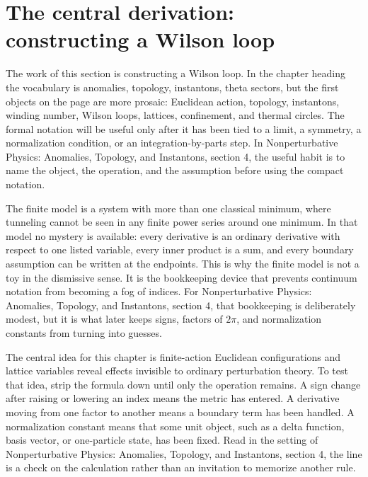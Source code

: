 \section{The central derivation: constructing a Wilson loop}













The work of this section is constructing a Wilson loop.  In the chapter heading the vocabulary is anomalies, topology, instantons, theta sectors, but the first objects on the page are more prosaic: Euclidean action, topology, instantons, winding number, Wilson loops, lattices, confinement, and thermal circles.  The formal notation will be useful only after it has been tied to a limit, a symmetry, a normalization condition, or an integration-by-parts step.  In Nonperturbative Physics: Anomalies, Topology, and Instantons, section 4, the useful habit is to name the object, the operation, and the assumption before using the compact notation.

The finite model is a system with more than one classical minimum, where tunneling cannot be seen in any finite power series around one minimum.  In that model no mystery is available: every derivative is an ordinary derivative with respect to one listed variable, every inner product is a sum, and every boundary assumption can be written at the endpoints.  This is why the finite model is not a toy in the dismissive sense.  It is the bookkeeping device that prevents continuum notation from becoming a fog of indices.  For Nonperturbative Physics: Anomalies, Topology, and Instantons, section 4, that bookkeeping is deliberately modest, but it is what later keeps signs, factors of \(2\pi\), and normalization constants from turning into guesses.

The central idea for this chapter is finite-action Euclidean configurations and lattice variables reveal effects invisible to ordinary perturbation theory.  To test that idea, strip the formula down until only the operation remains.  A sign change after raising or lowering an index means the metric has entered.  A derivative moving from one factor to another means a boundary term has been handled.  A normalization constant means that some unit object, such as a delta function, basis vector, or one-particle state, has been fixed.  Read in the setting of Nonperturbative Physics: Anomalies, Topology, and Instantons, section 4, the line is a check on the calculation rather than an invitation to memorize another rule.

